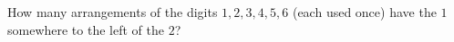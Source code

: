 How many arrangements of the digits $1,2,3,4,5,6$ (each used once) have the $1$ somewhere to the left of the $2$?
